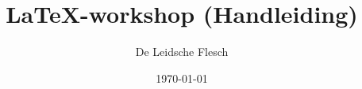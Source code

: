 \usepackage{color}

\usepackage{graphicx} %

\usepackage{enumerate}

\usepackage[official]{eurosym}

\usepackage{url}

\usepackage{float}

\usepackage{listings}
\lstset{language=C++}

\usepackage{listings} %
\lstset{language=C++}



\newcommand{\beqn}{\begin{eqnarray*}} %
\newcommand{\eeqn}{\end{eqnarray*}} %

\newcommand{\N}{\mathbb{N}} %
\newcommand{\pyth}[3]{#1^2 + #2^2 = #3^2} %





\title{\LaTeX-workshop (Handleiding)}
\author{De Leidsche Flesch}
\date{\today}	%






